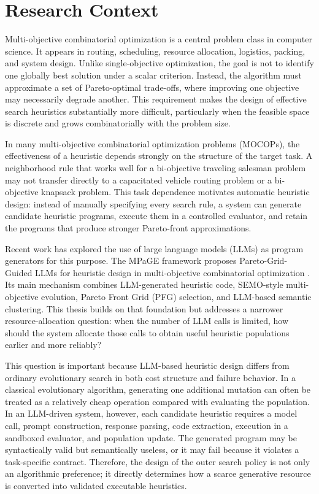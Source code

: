 \documentclass[../main.tex]{subfiles}
\begin{document}
\section{Research Context}

Multi-objective combinatorial optimization is a central problem class in computer science. It appears in routing, scheduling, resource allocation, logistics, packing, and system design. Unlike single-objective optimization, the goal is not to identify one globally best solution under a scalar criterion. Instead, the algorithm must approximate a set of Pareto-optimal trade-offs, where improving one objective may necessarily degrade another. This requirement makes the design of effective search heuristics substantially more difficult, particularly when the feasible space is discrete and grows combinatorially with the problem size.

In many multi-objective combinatorial optimization problems (MOCOPs), the effectiveness of a heuristic depends strongly on the structure of the target task. A neighborhood rule that works well for a bi-objective traveling salesman problem may not transfer directly to a capacitated vehicle routing problem or a bi-objective knapsack problem. This task dependence motivates automatic heuristic design: instead of manually specifying every search rule, a system can generate candidate heuristic programs, execute them in a controlled evaluator, and retain the programs that produce stronger Pareto-front approximations.

Recent work has explored the use of large language models (LLMs) as program generators for this purpose. The MPaGE framework proposes Pareto-Grid-Guided LLMs for heuristic design in multi-objective combinatorial optimization \cite{ha2026mpage}. Its main mechanism combines LLM-generated heuristic code, SEMO-style multi-objective evolution, Pareto Front Grid (PFG) selection, and LLM-based semantic clustering. This thesis builds on that foundation but addresses a narrower resource-allocation question: when the number of LLM calls is limited, how should the system allocate those calls to obtain useful heuristic populations earlier and more reliably?

This question is important because LLM-based heuristic design differs from ordinary evolutionary search in both cost structure and failure behavior. In a classical evolutionary algorithm, generating one additional mutation can often be treated as a relatively cheap operation compared with evaluating the population. In an LLM-driven system, however, each candidate heuristic requires a model call, prompt construction, response parsing, code extraction, execution in a sandboxed evaluator, and population update. The generated program may be syntactically valid but semantically useless, or it may fail because it violates a task-specific contract. Therefore, the design of the outer search policy is not only an algorithmic preference; it directly determines how a scarce generative resource is converted into validated executable heuristics.
\end{document}
